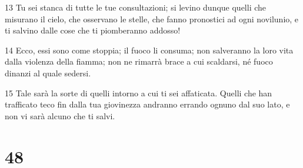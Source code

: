 \par 13 Tu sei stanca di tutte le tue consultazioni; si levino dunque quelli che misurano il cielo, che osservano le stelle, che fanno pronostici ad ogni novilunio, e ti salvino dalle cose che ti piomberanno addosso!
\par 14 Ecco, essi sono come stoppia; il fuoco li consuma; non salveranno la loro vita dalla violenza della fiamma; non ne rimarrà brace a cui scaldarsi, né fuoco dinanzi al quale sedersi.
\par 15 Tale sarà la sorte di quelli intorno a cui ti sei affaticata. Quelli che han trafficato teco fin dalla tua giovinezza andranno errando ognuno dal suo lato, e non vi sarà alcuno che ti salvi.

\chapter{48}

